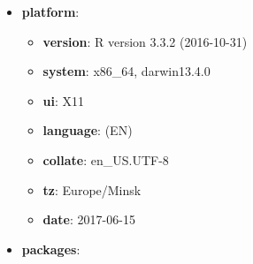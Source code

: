 \documentclass[]{article}
\providecommand{\tightlist}{%
  \setlength{\itemsep}{0pt}\setlength{\parskip}{0pt}}
\begin{document}
\begin{itemize}
\item
  \textbf{platform}:

  \begin{itemize}
  \tightlist
  \item
    \textbf{version}: R version 3.3.2 (2016-10-31)
  \item
    \textbf{system}: x86\_64, darwin13.4.0
  \item
    \textbf{ui}: X11
  \item
    \textbf{language}: (EN)
  \item
    \textbf{collate}: en\_US.UTF-8
  \item
    \textbf{tz}: Europe/Minsk
  \item
    \textbf{date}: 2017-06-15
  \end{itemize}
\item
  \textbf{packages}:


\end{itemize}
\end{document}

